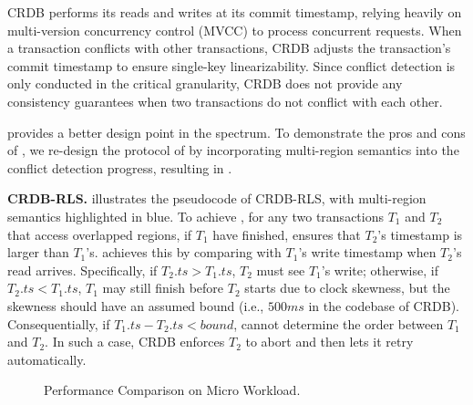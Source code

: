 CRDB performs its reads and writes at its commit timestamp, relying heavily on multi-version concurrency control (MVCC) to process concurrent requests. When a transaction conflicts with other transactions, CRDB adjusts the transaction's commit timestamp to ensure single-key linearizability. Since conflict detection is only conducted in the critical granularity, CRDB does not provide any consistency guarantees when two transactions do not conflict with each other. 


\xxcons provides a better design point in the spectrum. To demonstrate the pros and cons of \xxcons, we re-design the protocol of \crdb by incorporating multi-region semantics into the conflict detection progress, resulting in \crdbxx. 

\noindent\textbf{CRDB-RLS.}  
 illustrates the pseudocode of CRDB-RLS, with multi-region semantics highlighted in blue. To achieve \xxcons, for any two transactions $T_1$ and $T_2$ that access overlapped regions, if $T_1$ have finished, \crdbxx ensures that $T_2$'s timestamp is larger than $T_1$'s.  \crdb achieves this by comparing with $T_1$'s write timestamp when $T_2$'s read arrives. Specifically, if $T_2.ts > T_1.ts$, $T_2$ must see $T_1$'s write; otherwise, if $T_2.ts < T_1.ts$, $T_1$ may still finish before $T_2$ starts due to clock skewness, but the skewness should have an assumed bound (i.e., $500ms$ in the codebase of CRDB). Consequentially, if $T_1.ts - T_2.ts < bound$, \crdb cannot determine the order between $T_1$ and $T_2$. In such a case, CRDB enforces $T_2$ to abort and then lets it retry automatically. 

\begin{figure}[t]
	\centering
	\caption{Performance Comparison on Micro Workload.}\label{fig:eval:kv}
\end{figure}

